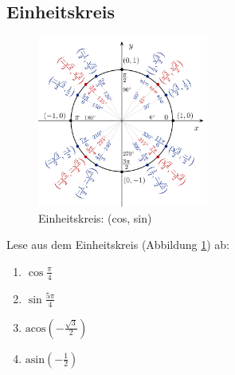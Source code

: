 \documentclass[11pt, a4paper]{article}
\newcommand\braces[1]{\left(#1\right)}
\newcommand{\acos}[1]{\mathrm{acos}\braces{#1}}
\newcommand{\asin}[1]{\mathrm{asin}\braces{#1}}
\newif\ifshowsolution
\begin{document}
\subsection{Einheitskreis}
\begin{figure}[h!]
	\centering
	\includegraphics[width=0.5\textwidth]{Einheitskreis.png}
	\caption{Einheitskreis: (cos, sin)}
	\label{einheitskreis}
\end{figure}
Lese aus dem Einheitskreis (Abbildung \ref{einheitskreis}) ab:
\begin{enumerate}
	\item $\cos \frac{\pi}{4}$
	
	\ifshowsolution
		$\cos \frac{\pi}{4} = \frac{\sqrt{2}}{2}$
	\fi
	
	\item $\sin \frac{5\pi}{4}$
	
	\ifshowsolution
		$\sin \frac{5\pi}{4} = -\frac{\sqrt{2}}{2}$
	\fi
	
	\item $\acos{-\frac{\sqrt{3}}{2}}$
	
	\ifshowsolution
		$\acos{-\frac{\sqrt{3}}{2}} = \frac{5\pi}{6} \text{ bzw. } \frac{7\pi}{6}$
	\fi
	
	\item $\asin{-\frac{1}{2}}$
	
	\ifshowsolution
		$\asin{-\frac{1}{2}} = \frac{7\pi}{6} \text{ bzw. } \frac{11\pi}{6}$
	\fi
	
\end{enumerate}
\end{document}
